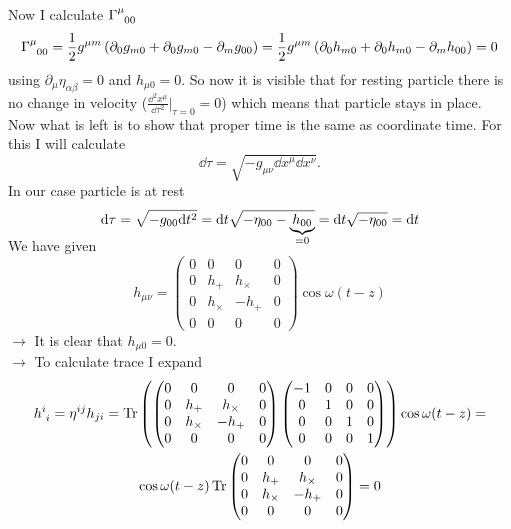 Now I calculate $\Gamma\indices{^\mu_0_0}$
%
\begin{equation}
    \Gamma\indices{^\mu_0_0} = \frac{1}{2}g^{\mu m}\left(
    \partial_0 g_{m0} +
    \partial_0 g_{m0} -
    \partial_m g_{00}
    \right) =
    \frac{1}{2}g^{\mu m}\left(
    \partial_0 h_{m0} +
    \partial_0 h_{m0} -
    \partial_m h_{00}
    \right) = 0
\end{equation}
%
using $\partial_\mu \eta_{\alpha\beta} = 0$ and $h_{\mu0} = 0$. So now it is
visible that for resting particle there is no change in velocity ($\frac{\dd^2
        x^\mu}{\dd \tau^2} \big|_{\tau=0} = 0$) which means that particle stays in
place.
%
\subproblem
%
Now what is left is to show that proper time is the same as coordinate time. For
this I will calculate
%
\begin{equation}
    \dd \tau = \sqrt{-g_{\mu\nu}\dd x^\mu \dd x^\nu}.
\end{equation}
%
In our case particle is at rest
%
\begin{equation}
    \dd \tau = \sqrt{-g_{00}\dd t^2} =
    \dd t \sqrt{-\eta_{00}-\smash[b]{\underbrace{h_{00}}_{=0}}} =
    \dd t \sqrt{-\eta_{00}} = \dd t
\end{equation}
%
\problem
%
We have given
%
\begin{equation}
    h_{\mu\nu} =
    \begin{pmatrix}
        0 & 0        & 0        & 0 \\
        0 & h_+      & h_\times & 0 \\
        0 & h_\times & -h_+     & 0 \\
        0 & 0        & 0        & 0
    \end{pmatrix}
    \cos\omega(t-z)
\end{equation}
%
\subproblem
%
$\rightarrow$ It is clear that $h_{\mu0} = 0$. \\
$\rightarrow$ To calculate trace I expand
%
\begin{multline}
    h\indices{^i_i} = \eta^{ij}h_{ji} = \Tr
    \left(\begin{pmatrix}
            0 & 0        & 0        & 0 \\
            0 & h_+      & h_\times & 0 \\
            0 & h_\times & -h_+     & 0 \\
            0 & 0        & 0        & 0
        \end{pmatrix}
    \begin{pmatrix}
            -1 & 0 & 0 & 0 \\
            0  & 1 & 0 & 0 \\
            0  & 0 & 1 & 0 \\
            0  & 0 & 0 & 1
        \end{pmatrix}\right)\cos\omega(t-z)=\\
    \cos\omega(t-z)\Tr
    \begin{pmatrix}
        0 & 0        & 0        & 0 \\
        0 & h_+      & h_\times & 0 \\
        0 & h_\times & -h_+     & 0 \\
        0 & 0        & 0        & 0
    \end{pmatrix} = 0
\end{multline}
